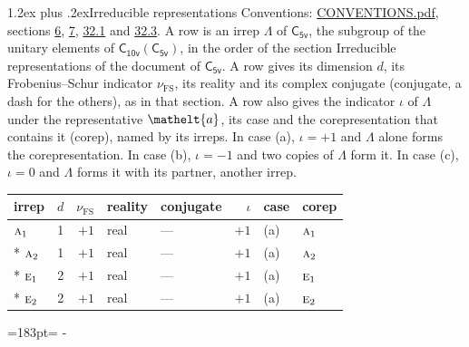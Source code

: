 \documentclass[10pt,a4paper]{article}
\makeatletter
\renewcommand\section{\@startsection{section}{1}{\z@}{-3ex plus -1ex minus -.2ex}%
  {1.2ex plus .2ex}{\normalfont\large\sffamily\bfseries\color{parttitle}}}
\newcommand{\needspace}[1]{\par\penalty-100\begingroup\dimen0=#1\relax\dimen2=\pagegoal
  \advance\dimen2-\pagetotal\ifdim\dimen0>\dimen2\relax\ifdim\dimen2>0pt\vfil\break\fi\fi
  \endgroup}
\numberwithin{equation}{section}
\newcommand{\eltfont}[1]{{\let\sigma\eltsigma\mathelt{#1}}}
\newcommand{\grp}[1]{\mathsf{#1}}
\newcommand{\irr}[1]{\text{\normalfont\scshape #1}}
\newcommand{\elt}[1]{\eltfont{#1}}
\newcommand{\fsind}{\nu_{\mathrm{FS}}}
\makeatother
\begin{document}
\section{Irreducible representations}\label{s:irreps}
Conventions: \href{../../CONVENTIONS.pdf}{CONVENTIONS.pdf}, sections \href{../../../rotation/CONVENTIONS.pdf\#conv.6}{6}, \href{../../../rotation/CONVENTIONS.pdf\#conv.7}{7}, \href{../../CONVENTIONS.pdf\#conv.32.1}{32.1} and \href{../../CONVENTIONS.pdf\#conv.32.3}{32.3}.
\leavevmode\label{n:irrep.Delta}A row is an irrep $\Lambda$ of $\grp{C_{5v}}$, the subgroup of the unitary elements of $\grp{C_{10v}}(\grp{C_{5v}})$, in the order of the section Irreducible representations of the document of \href{../../../rotation/data/pdf/C5v.pdf}{$\grp{C_{5v}}$}. \label{n:index.dimension}\label{n:index.frobenius}\label{n:head.irrep}\label{n:head.reality}\label{n:head.conjugate}A row gives its dimension $d$, its Frobenius--Schur indicator $\fsind$, its reality and its complex conjugate (conjugate, a dash for the others), as in that section. \label{n:head.case.corep}\label{n:head.corep}A row also gives the indicator $\iota$ of $\Lambda$ under the representative $\elt{a}$, its case and the corepresentation that contains it (corep), named by its irreps. In case (a), $\iota = +1$ and $\Lambda$ alone forms the corepresentation. In case (b), $\iota = -1$ and two copies of $\Lambda$ form it. In case (c), $\iota = 0$ and $\Lambda$ forms it with its partner, another irrep.
\setlength{\emergencystretch}{2em}\par\setlength{\emergencystretch}{0pt}
{\small\renewcommand{\arraystretch}{1.25}\setlength{\tabcolsep}{4pt}\begin{longtable}{@{}lrrllrll@{}}\toprule
irrep & $d$ & $\fsind$ & reality & conjugate & $\iota$ & case & corep\\\midrule\endhead
\bottomrule\endfoot\endlastfoot
$\irr{a}_{1}$ & 1 & $+1$ & real & --- & $+1$ & (a) & $\irr{a}_{1}$\\*
$\irr{a}_{2}$ & 1 & $+1$ & real & --- & $+1$ & (a) & $\irr{a}_{2}$\\*
$\irr{e}_{1}$ & 2 & $+1$ & real & --- & $+1$ & (a) & $\irr{e}_{1}$\\*
$\irr{e}_{2}$ & 2 & $+1$ & real & --- & $+1$ & (a) & $\irr{e}_{2}$\\
\bottomrule\end{longtable}}
\needspace{183pt}
\end{document}
